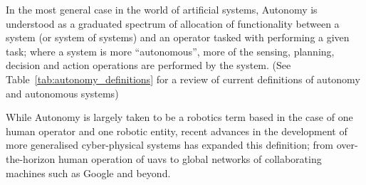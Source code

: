  
In the most general case in the world of artificial systems, Autonomy is understood as a graduated spectrum of allocation of functionality between a system (or system of systems) and an operator tasked with performing a given task; where a system is more ``autonomous'', more of the sensing, planning, decision and action operations are performed by the system. (See Table~\ref{tab:autonomy_definitions} for a review of current definitions of autonomy and autonomous systems)

While Autonomy is largely taken to be a robotics term based in the case of one human operator and one robotic entity, recent advances in the development of more generalised cyber-physical systems has expanded this definition; from over-the-horizon human operation of \glspl{uav} to global networks of collaborating machines such as Google and beyond.


